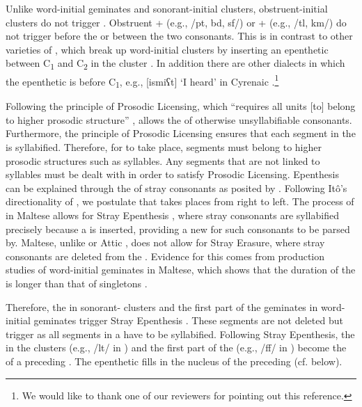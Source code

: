 \documentclass[output=paper]{langsci/langscibook}
\begin{document}
Unlike word-initial geminates and sonorant-initial clusters, obstruent-initial clusters do not trigger . Obstruent +  (e.g., /pt, bd, sf/) or  +  (e.g., /tl, km/) do not trigger  before the  or between the two consonants. This is in contrast to other varieties of , which break up word-initial clusters by inserting an epenthetic  between C\textsubscript{1} and C\textsubscript{2} in the cluster \citep[cf.][]{watson2007,kiparsky2003}. In addition there are other dialects in which the epenthetic  is before C\textsubscript{1}, e.g., [ismiʕt] ‘I heard’ in Cyrenaic  \citep[cf.][]{Mitchell1960}.\footnote{We would like to thank one of our reviewers for pointing out this reference.} 

Following the principle of Prosodic Licensing, which “requires all  units [to] belong to higher prosodic structure” \citep[3]{ito1986},  allows the  of otherwise unsyllabifiable consonants. Furthermore, the principle of Prosodic Licensing ensures that each segment in the  is syllabified. Therefore, for  to take place, segments must belong to higher prosodic structures such as syllables. Any segments that are not linked to syllables must be dealt with in order to satisfy Prosodic Licensing. Epenthesis can be explained through the  of stray consonants as posited by \citealt{ito1986,ito1989}. Following Itô’s directionality of , we postulate that  takes places from right to left. The process of  in Maltese allows for Stray Epenthesis \citep{ito1986}, where stray consonants are syllabified precisely because a  is inserted, providing a new  for such consonants to be parsed by. Maltese, unlike  or Attic , does not allow for Stray Erasure, where stray consonants are deleted from the . Evidence for this comes from production studies of word-initial geminates in Maltese, which shows that the duration of the  is longer than that of singletons \citep[cf.][]{galeacues}.

Therefore, the  in sonorant- clusters and the first part of the geminates in word-initial geminates trigger Stray Epenthesis \citep{ito1986}. These segments are not deleted but trigger  as all segments in a  have to be syllabified. Following Stray Epenthesis, the  in the  clusters (e.g., /lt/ in ) and the first part of the  (e.g., /ff/ in ) become the  of a preceding . The epenthetic  fills in the nucleus of the preceding  (cf.  below). 
\end{document}

